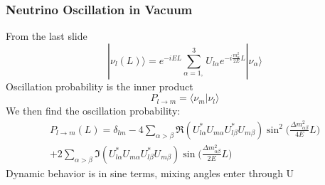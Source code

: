 \documentclass[10pt,professionalfonts,xcolor=table]{beamer}
\begin{document}
\frame
{
  \frametitle{Neutrino Oscillation in Vacuum}
  \begin{itemize}
  \bang From the last slide
	\begin{equation*}
		|\nu_l(L) \rangle = e^{-iEL} \sum_{\alpha = 1,}^3 U_{l\alpha}e^{-i\frac{m_\alpha^2}{2E} L}|\nu_\alpha \rangle
	\end{equation*}
\bang Oscillation probability is the inner product
  \begin{equation*}
P_{l\rightarrow m} = 	 \langle \nu_m|\nu_l \rangle
	\end{equation*}
	\bang We then find the oscillation probability:
	\begin{equation*}\begin{split}
P_{l\rightarrow m}(L) =  \delta_{lm} - 4  \sum_{\alpha > \beta}  \Re(U^*_{l\alpha}U_{m\alpha}U^*_{l\beta}U_{m\beta}) \sin^2 \bigg(\frac{\Delta m_{\alpha\beta}^2}{4E} L\bigg) \\
 + 2  \sum_{\alpha>\beta}  \Im(U^*_{l\alpha}U_{m\alpha}U^*_{l\beta}U_{m\beta}) \sin\bigg(\frac{\Delta m_{\alpha\beta}^2}{2E}L\bigg)
\end{split}\end{equation*}
	\bang Dynamic behavior is in sine terms, mixing angles enter through U


  \end{itemize}
}
\end{document}
